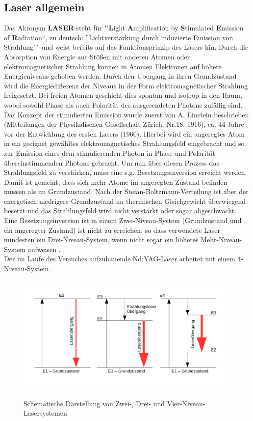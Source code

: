 \documentclass[twoside,colorback,accentcolor=tud4c,11pt]{tudreport}
\begin{document}
\subsection{Laser allgemein}
Das Akronym  \textbf{LASER} steht für "'\textbf{L}ight \textbf{A}mplification by \textbf{S}timulated \textbf{E}mission of \textbf{R}adiation"`, zu deutsch: "'Lichtverstärkung durch induzierte Emission von Strahlung"` und weist bereits auf das Funktionsprinzip des Lasers hin. Durch die Absorption von Energie aus Stößen mit anderen Atomen oder elektromagnetischer Strahlung können in Atomen Elektronen auf höhere Energieniveaus gehoben werden. Durch den Übergang in ihren Grundzustand wird die Energiedifferenz der Niveaus in der Form elektromagnetischer Strahlung freigesetzt. Bei freien Atomen geschieht dies spontan und isotrop in den Raum, wobei sowohl Phase als auch Polarität des ausgesendeten Photons zufällig sind.\\
Das Konzept der stimulierten Emission wurde zuerst von A. Einstein beschrieben (Mitteilungen der Physikalischen Gesellschaft Zürich. Nr.18, 1916), ca. 44 Jahre vor der Entwicklung des ersten Lasers (1960). Hierbei wird ein angeregtes Atom in ein geeignet gewähltes elektromagnetisches Strahlungsfeld eingebracht und so zur Emission eines dem stimulierenden Photon in Phase und Polarität übereinstimmenden Photons gebracht. Um nun über diesen Prozess das Strahlungsfeld zu verstärken, muss eine s.g. Besetzungsinversion erreicht werden. Damit ist gemeint, dass sich mehr Atome im angeregten Zustand befinden müssen als im Grundzustand. Nach der Stefan-Boltzmann-Verteilung ist aber der energetisch niedrigere Grundzustand im thermischen Gleichgewicht überwiegend besetzt und das Strahlungsfeld wird nicht verstärkt oder sogar abgeschwächt. Eine Besetzungsinversion ist in einem Zwei-Niveau-System (Grundzustand und ein angeregter Zustand) ist nicht zu erreichen, so dass verwendete Laser mindesten ein Drei-Niveau-System, wenn nicht sogar ein höheres Mehr-Niveau-System aufweisen \cite{1}.\\
Der im Laufe des Versuches aufzubauende Nd:YAG-Laser arbeitet mit einem 4-Niveau-System.
\begin{figure}[H]
\centering
   	\begin{minipage}[b]{0.8\textwidth}
   	\includegraphics[width=\textwidth]{graphics/Lasersys.pdf}
  	\label{lasys}
   	\end{minipage}
\caption{Schematische Darstellung von Zwei-, Drei- und Vier-Niveau-Lasersystemen} 	
\end{figure}
\end{document}
